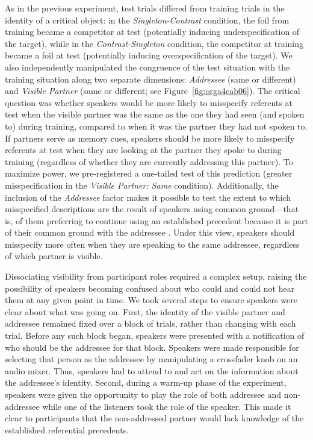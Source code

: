 \documentclass[natbib,man,a4paper]{apa6}
\begin{document}
As in the previous experiment, test trials differed from training trials in the identity of a critical object: in the \emph{Singleton-Contrast} condition, the foil from training became a competitor at test (potentially inducing underspecification of the target), while in the \emph{Contrast-Singleton} condition, the competitor at training became a foil at test (potentially inducing overspecification of the target). We also independently manipulated the congruence of the test situation with the training situation along two separate dimensions: \emph{Addressee} (same or different) and \emph{Visible Partner} (same or different; see Figure~\ref{fig:orga4cab06}). The critical question was whether speakers would be more likely to misspecify referents at test when the visible partner was the same as the one they had seen (and spoken to) during training, compared to when it was the partner they had not spoken to.  If partners serve as memory cues, speakers should be more likely to misspecify referents at test when they are looking at the partner they spoke to during training (regardless of whether they are currently addressing this partner). To maximize power, we pre-registered a one-tailed test of this prediction (greater misspecification in the \emph{Visible Partner: Same} condition).  Additionally, the inclusion of the \emph{Addressee} factor makes it possible to test the extent to which misspecified descriptions are the result of speakers using common ground---that is, of them preferring to continue using an established precedent because it is part of their common ground with the addressee \citep{brennanclark96}. Under this view, speakers should misspecify more often when they are speaking to the same addressee, regardless of which partner is visible.

Dissociating visibility from participant roles required a complex setup, raising the possibility of speakers becoming confused about who could and could not hear them at any given point in time. We took several steps to ensure speakers were clear about what was going on. First, the identity of the visible partner and addressee remained fixed over a block of trials, rather than changing with each trial. Before any such block began, speakers were presented with a notification of who should be the addressee for that block. Speakers were made responsible for selecting that person as the addressee by manipulating a crossfader knob on an audio mixer. Thus, speakers had to attend to and act on the information about the addressee's identity. Second, during a warm-up phase of the experiment, speakers were given the opportunity to play the role of both addressee and non-addressee while one of the listeners took the role of the speaker. This made it clear to participants that the non-addressed partner would lack knowledge of the established referential precedents. 
\end{document}
